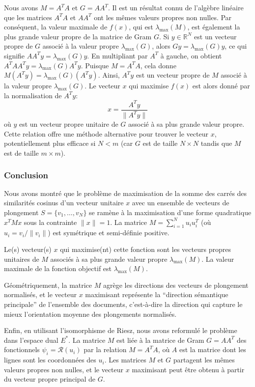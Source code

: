 \documentclass[11pt,a4paper]{report}
\begin{document}
Nous avons \(M = A^T A\) et \(G = A A^T\). Il est un résultat connu de
l'algèbre linéaire que les matrices \(A^T A\) et \(A A^T\) ont les mêmes
valeurs propres non nulles. Par conséquent, la valeur maximale de
\(f(x)\), qui est \(\lambda_{\max}(M)\), est également la plus grande
valeur propre de la matrice de Gram \(G\). Si \(y \in \mathbb{R}^N\) est
un vecteur propre de \(G\) associé à la valeur propre
\(\lambda_{\max}(G)\), alors \(G y = \lambda_{\max}(G) y\), ce qui
signifie \(A A^T y = \lambda_{\max}(G) y\). En multipliant par \(A^T\) à
gauche, on obtient \(A^T A A^T y = \lambda_{\max}(G) A^T y\). Puisque
\(M = A^T A\), cela donne \(M (A^T y) = \lambda_{\max}(G) (A^T y)\).
Ainsi, \(A^T y\) est un vecteur propre de \(M\) associé à la valeur
propre \(\lambda_{\max}(G)\). Le vecteur \(x\) qui maximise \(f(x)\) est
alors donné par la normalisation de \(A^T y\):
\[ x = \frac{A^T y}{\|A^T y\|} \] où \(y\) est un vecteur propre
unitaire de \(G\) associé à sa plus grande valeur propre. Cette relation
offre une méthode alternative pour trouver le vecteur \(x\),
potentiellement plus efficace si \(N < m\) (car \(G\) est de taille
\(N \times N\) tandis que \(M\) est de taille \(m \times m\)).

\hypertarget{conclusion}{%
\subsubsection{Conclusion}\label{conclusion}}

Nous avons montré que le problème de maximisation de la somme des carrés
des similarités cosinus d'un vecteur unitaire \(x\) avec un ensemble de
vecteurs de plongement \(S = \{v_1, \dots, v_N\}\) se ramène à la
maximisation d'une forme quadratique \(x^T M x\) sous la contrainte
\(\|x\|=1\). La matrice \(M = \sum_{i=1}^N u_i u_i^T\) (où
\(u_i = v_i/\|v_i\|\)) est symétrique et semi-définie positive.

Le(s) vecteur(s) \(x\) qui maximise(nt) cette fonction sont les vecteurs
propres unitaires de \(M\) associés à sa plus grande valeur propre
\(\lambda_{\max}(M)\). La valeur maximale de la fonction objectif est
\(\lambda_{\max}(M)\).

Géométriquement, la matrice \(M\) agrège les directions des vecteurs de
plongement normalisés, et le vecteur \(x\) maximisant représente la
``direction sémantique principale'' de l'ensemble des documents,
c'est-à-dire la direction qui capture le mieux l'orientation moyenne des
plongements normalisés.

Enfin, en utilisant l'isomorphisme de Riesz, nous avons reformulé le
problème dans l'espace dual \(E^*\). La matrice \(M\) est liée à la
matrice de Gram \(G = A A^T\) des fonctionnels
\(\psi_i = \mathcal{R}(u_i)\) par la relation \(M = A^T A\), où \(A\)
est la matrice dont les lignes sont les coordonnées des \(u_i\). Les
matrices \(M\) et \(G\) partagent les mêmes valeurs propres non nulles,
et le vecteur \(x\) maximisant peut être obtenu à partir du vecteur
propre principal de \(G\).
\end{document}
